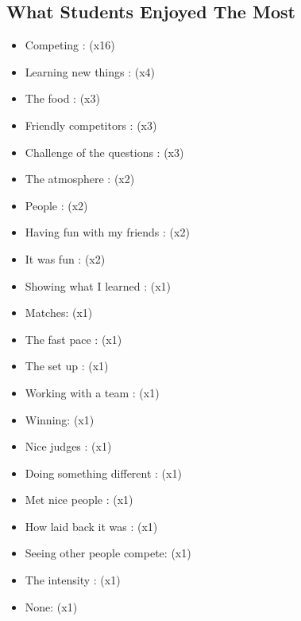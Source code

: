 \documentclass{article}%
\begin{document}
\begin{multicols}{2}%
\section{What Students Enjoyed The Most}%
\label{sec:WhatStudentsEnjoyedTheMost}%
\begin{itemize}%
\item%
Competing : (x16)%
\item%
Learning new things : (x4)%
\item%
The food : (x3)%
\item%
Friendly competitors : (x3)%
\item%
Challenge of the questions : (x3)%
\item%
The atmosphere : (x2)%
\item%
People : (x2)%
\item%
Having fun with my friends : (x2)%
\item%
It was fun : (x2)%
\item%
Showing what I learned : (x1)%
\item%
Matches: (x1)%
\item%
The fast pace : (x1)%
\item%
The set up : (x1)%
\item%
Working with a team : (x1)%
\item%
Winning: (x1)%
\item%
Nice judges : (x1)%
\item%
Doing something different : (x1)%
\item%
Met nice people : (x1)%
\item%
How laid back it was : (x1)%
\item%
Seeing other people compete: (x1)%
\item%
The intensity : (x1)%
\item%
None: (x1)%
\end{itemize}

%
\end{multicols}%
\noindent\makebox[\linewidth]{\rule{\paperwidth}{0.4pt}}%
\end{document}

